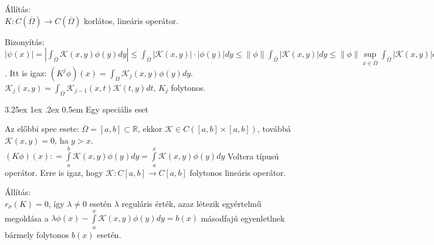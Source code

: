 \documentclass[12pt,a4paper]{scrartcl}
\makeatletter
\renewcommand\paragraph{\@startsection{paragraph}{4}{\z@}%
                                    {3.25ex \@plus1ex \@minus.2ex}%
                                    {0.5em} %
                                    {\normalfont\normalsize\bfseries}}
\newenvironment{bizonyitas}{}{}
\newenvironment{allitas}{}{}
\makeatother
\begin{document}
\begin{allitas}

Állítás:\\
\(\left. K:C\left( \overline{\Omega} \right)\rightarrow C\left( \overline{\Omega} \right) \right.\)
korlátos, lineáris operátor.

\end{allitas}

\begin{bizonyitas}

Bizonyítás:\\
\(\left| {\psi\left( x \right)} \right| = \left| {\int_{\overline{\Omega}}{\mathcal{K}\left( {x,y} \right)\phi\left( y \right)dy}} \right| \leq {\int_{\overline{\Omega}}{\left| {\mathcal{K}\left( {x,y} \right)} \right| \cdot \left| {\phi\left( y \right)} \right|dy}} \leq \left\| \phi \right\|{\int_{\overline{\Omega}}{\left| {\mathcal{K}\left( {x,y} \right)} \right|dy}} \leq \left\| \phi \right\|\sup\limits_{x \in \overline{\Omega}}{\int_{\overline{\Omega}}{\left| {\mathcal{K}\left( {x,y} \right)} \right|dy}}\).
Itt is igaz:
\(\left( {K^{j}\phi} \right)\left( x \right) = {\int_{\overline{\Omega}}{\mathcal{K}_{j}\left( {x,y} \right)\phi\left( y \right)dy}}\).
\(\mathcal{K}_{j}\left( {x,y} \right) = {\int_{\overline{\Omega}}{\mathcal{K}_{j - 1}\left( {x,t} \right)\mathcal{K}\left( {t,y} \right)dt}}\),
\(K_{j}\) folytonos.

\end{bizonyitas}

\hypertarget{egy-specialis-eset}{%
\paragraph{Egy speciális eset}\label{egy-specialis-eset}}

Az előbbi spec esete:
\(\overline{\Omega} = \left\lbrack {a,b} \right\rbrack \subset {\mathbb{R}}\),
ekkor
\(\mathcal{K} \in C\left( {\left\lbrack {a,b} \right\rbrack \times \left\lbrack {a,b} \right\rbrack} \right)\),
továbbá \(\mathcal{K}\left( {x,y} \right) = 0\), ha \(y > x\).
\(\left( {K\phi} \right)\left( x \right): = {\int\limits_{a}^{b}{\mathcal{K}\left( {x,y} \right)\phi\left( y \right)dy}} = {\int\limits_{a}^{x}{\mathcal{K}\left( {x,y} \right)\phi\left( y \right)dy}}\)
Voltera típusú operátor. Erre is igaz, hogy
\(\left. \mathcal{K}:C\left\lbrack {a,b} \right\rbrack\rightarrow C\left\lbrack {a,b} \right\rbrack \right.\)
folytonos lineáris operátor.

\begin{allitas}

Állítás:\\
\(r_{\sigma}\left( K \right) = 0\), így \(\lambda \neq 0\) esetén
\(\lambda\) reguláris érték, azaz létezik egyértelmű megoldása a
\(\lambda\phi\left( x \right) - {\int\limits_{a}^{x}{\mathcal{K}\left( {x,y} \right)\phi\left( y \right)dy}} = b\left( x \right)\)
másodfajú egyenletlnek bármely folytonos \(b\left( x \right)\) esetén.

\end{allitas}
\end{document}
